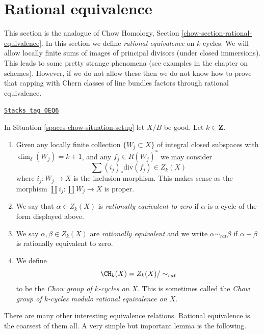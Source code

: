 \section{Rational equivalence}
\label{spaces-chow-section-rational-equivalence}
This section is the analogue of
Chow Homology, Section \ref{chow-section-rational-equivalence}.
In this section we define {\it rational equivalence} on $k$-cycles.
We will allow locally finite sums of images of
principal divisors (under closed immersions). This leads to some
pretty strange phenomena (see examples in the chapter on schemes).
However, if we do not allow these then we do not know how to prove that
capping with Chern classes of line bundles factors through rational
equivalence.

\begin{definition}
\label{spaces-chow-definition-rational-equivalence}
\href{https://stacks.math.columbia.edu/tag/0EQ6}{\texttt{Stacks tag 0EQ6}}

In Situation \ref{spaces-chow-situation-setup} let $X/B$ be good.
Let $k \in \mathbf{Z}$.
\begin{enumerate}
\item Given any locally finite collection $\{W_j \subset X\}$
of integral closed subspaces with $\dim_\delta(W_j) = k + 1$,
and any $f_j \in R(W_j)^*$ we may consider
$$
\sum (i_j)_*\text{div}(f_j) \in Z_k(X)
$$
where $i_j : W_j \to X$ is the inclusion morphism.
This makes sense as the morphism
$\coprod i_j : \coprod W_j \to X$ is proper.
\item We say that $\alpha \in Z_k(X)$ is {\it rationally equivalent to zero}
if $\alpha$ is a cycle of the form displayed above.
\item We say $\alpha, \beta \in Z_k(X)$ are
{\it rationally equivalent} and we write $\alpha \sim_{rat} \beta$
if $\alpha - \beta$ is rationally equivalent to zero.
\item We define
$$
\CH_k(X) = Z_k(X) / \sim_{rat}
$$
to be the {\it Chow group of $k$-cycles on $X$}. This is sometimes called
the {\it Chow group of $k$-cycles modulo rational equivalence on $X$}.
\end{enumerate}
\end{definition}

There are many other interesting equivalence relations.
Rational equivalence is the coarsest of them all.
A very simple but important lemma is the following.

